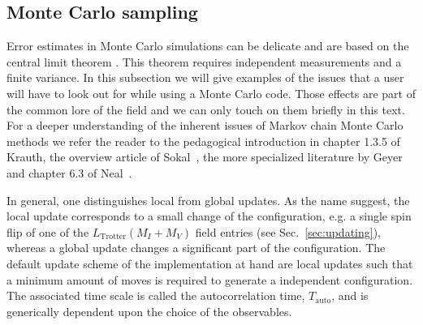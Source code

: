 %
\subsection{Monte Carlo sampling}\label{sec:sampling}
%
Error estimates  in Monte Carlo simulations  can be  delicate and are based on the central limit theorem \cite{Negele}. This theorem requires independent 
measurements and  a finite variance.
In this subsection we will give examples of the issues that a user will have to look out for while 
using a Monte Carlo code. Those effects are part of the common lore of the field
and we can only touch on them briefly  in this text.
For a deeper understanding of the inherent issues of Markov chain Monte Carlo methods 
we refer the reader to the pedagogical introduction in chapter 1.3.5 of Krauth\cite{Krauth2006}, the overview article of Sokal~\cite{Sokal89},  the more specialized literature by Geyer~\cite{Geyer1992} and chapter 6.3 of Neal~\cite{neal1993}. 

In general, one distinguishes local from global updates. As the name suggest, the local update corresponds to a small change of the configuration, e.g. a single spin flip of one of the $L_{\mathrm{Trotter}}(M_I+M_V)$ field entries (see Sec.~\ref{sec:updating}), whereas a global update changes a significant part of the configuration. The default update scheme of the implementation at hand are local updates such that a minimum amount of moves is required to generate a independent configuration. The associated time scale is called  the autocorrelation time, $T_\mathrm{auto}$, and is generically dependent upon the choice of the observables. 


